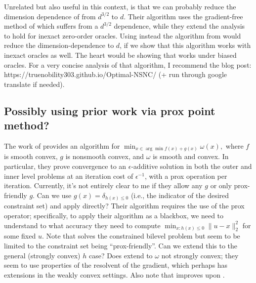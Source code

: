 Unrelated but also useful in this context, is that we can probably reduce the dimension dependence of \cite{chen2023bilevel} from $d^{3/2}$ to $d$. Their algorithm uses the gradient-free method of \cite{lin2022gradient} which suffers from a $d^{3/2}$ dependence, while they extend the analysis to hold for inexact zero-order oracles. Using instead the algorithm from \cite{kornowski2023algorithm} would reduce the dimension-dependence to $d$, if we show that this algorithm works with inexact oracles as well. The heart would be showing that \citep{cutkosky2023optimal} works under biased oracles. For a very concise analysis of that algorithm, I recommend the blog post: https://truenobility303.github.io/Optimal-NSNC/ (+ run through google translate if needed).

\subsection{Possibly using prior work via prox point method?}
The work of \cite{sabach2017first} provides an  algorithm for $\min_{x\in \arg\min f(x) + g(x)} \omega(x),$ where $f$ is smooth convex, $g$ is nonsmooth convex, and $\omega$ is smooth and convex. In particular, they prove convergence to an $\epsilon$-additive solution in both the outer and inner level problems at an iteration cost of $\epsilon^{-1}$, with a prox operation per iteration. Currently, it's not entirely clear to me if they allow any $g$ or only prox-friendly $g$. Can we use $g(x)= \delta_{h(x)\leq 0}$ (i.e., the indicator of the desired constraint set) and apply \cite{sabach2017first} directly? Their algorithm requires the use of the prox operator; specifically, to apply their algorithm as a blackbox, we need to understand to what accuracy they need to compute $\min_{x: h(x) \leq 0} \|u-x\|_2^2$ for some fixed $u$. Note that \cite{beck2014first} solves the constrained bilevel problem but seem to be limited to  the constraint set being ``prox-friendly''. Can we extend this to the general (strongly convex) $h$ case? Does \cite{sabach2017first} extend to $\omega$ not strongly convex; they seem to use properties of the resolvent of the gradient, which perhaps has extensions in the weakly convex settings. Also note that \cite{jiang2023conditional} improves upon \cite{sabach2017first}. 